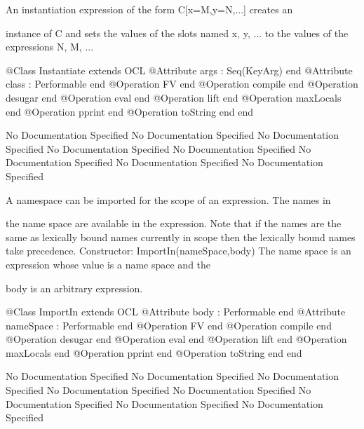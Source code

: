       An instantiation expression of the form C[x=M,y=N,...] creates an

      instance of C and sets the values of the slots named x, y, ... to 
      the values of the expressions N, M, ...
\begin{Interface}
@Class Instantiate extends OCL
  @Attribute args : Seq(KeyArg) end
  @Attribute class : Performable end
  @Operation FV end
  @Operation compile end
  @Operation desugar end
  @Operation eval end
  @Operation lift end
  @Operation maxLocals end
  @Operation pprint end
  @Operation toString end
end
\end{Interface}
No Documentation Specified
No Documentation Specified
No Documentation Specified
No Documentation Specified
No Documentation Specified
No Documentation Specified
No Documentation Specified
No Documentation Specified

      A namespace can be imported for the scope of an expression. The names in

      the name space are available in the expression. Note that if the names 
      are the same as lexically bound names currently in scope then the 
      lexically bound names take precedence.
      Constructor: ImportIn(nameSpace,body)
        The name space is an expression whose value is a name space and the

        body is an arbitrary expression.
\begin{Interface}
@Class ImportIn extends OCL
  @Attribute body : Performable end
  @Attribute nameSpace : Performable end
  @Operation FV end
  @Operation compile end
  @Operation desugar end
  @Operation eval end
  @Operation lift end
  @Operation maxLocals end
  @Operation pprint end
  @Operation toString end
end
\end{Interface}
No Documentation Specified
No Documentation Specified
No Documentation Specified
No Documentation Specified
No Documentation Specified
No Documentation Specified
No Documentation Specified
No Documentation Specified

